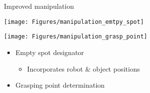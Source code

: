 \documentclass[12pt,a4paper]{article}
\newcommand{\emptylogo}{\texttt{[image: Figures/Empty]}}
\begin{document}
\begin{slidetop}
\begin{multicols}{2}
\vspace{-0.8cm} %

\begin{bclogo}[couleur = white, arrondi = 0.25, couleurBord = tuedarkblue , barre = none, logo=\emptylogo]{\textcolor{tuedarkblue}{Improved manipulation}}
\medskip %
\begin{minipage}[T]{0.48\textwidth}
    \begin{center}
        \texttt{[image: Figures/manipulation\_emtpy\_spot]}
    \end{center}
\end{minipage}
\hfill
\begin{minipage}[T]{0.48\textwidth}
    \begin{center}
        \texttt{[image: Figures/manipulation\_grasp\_point]}
    \end{center}
\end{minipage}
\begin{itemize}[itemsep = 0pt, parsep = 0pt, leftmargin=15pt]
	\item Empty spot designator
    \begin{itemize}[itemsep = 0pt, parsep = 0pt, leftmargin=15pt]
		\item Incorporates robot \& object positions
	\end{itemize}
	\item Grasping point determination
\end{itemize}
\end{bclogo}

\vspace{-0.8cm} %


\end{multicols}
\end{slidetop}
\end{document}
